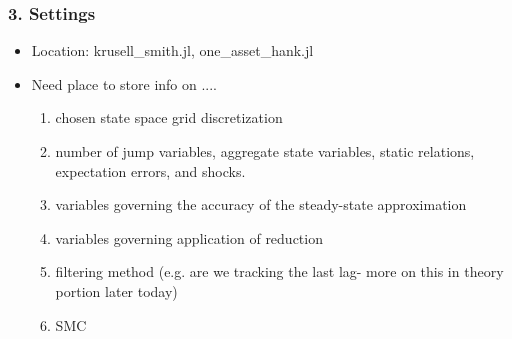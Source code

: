 \documentclass{beamer}
\begin{document}
\begin{frame}
\frametitle{3. Settings} %
\begin{itemize}
  \item Location: krusell\_smith.jl, one\_asset\_hank.jl
\item Need place to store info on ....
  \begin{enumerate}
  \item chosen state space grid discretization
  \item number of jump variables, aggregate state variables, static relations, expectation errors, and shocks.
  \item variables governing the accuracy of the steady-state approximation
  \item variables governing application of reduction
  \item filtering method (e.g. are we tracking the last lag- more on this in theory portion later today)
  \item SMC
  \end{enumerate}
\end{itemize}
\end{frame}
\end{document}

